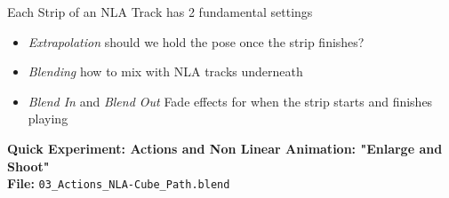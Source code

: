 \documentclass{article}
\begin{document}
Each Strip of an NLA Track has 2 fundamental settings 
\begin{itemize}[noitemsep, topsep=0pt]
    \item \textit{Extrapolation} should we hold the pose once the strip finishes?
    \item \textit{Blending} how to mix with NLA tracks underneath
    \item \textit{Blend In} and \textit{Blend Out} Fade effects for when the strip starts and finishes playing
\end{itemize}
\begin{mdframed}[linewidth=2pt, linecolor=gray, roundcorner=1pt, innermargin=2pt, outermargin=2pt]
    \textbf{\Large Quick Experiment: Actions and Non Linear Animation: "Enlarge and Shoot"} \\[6pt]
    \textbf{File:} \texttt{03\_Actions\_NLA-Cube\_Path.blend} \\[6pt]


\end{mdframed}
\end{document}

